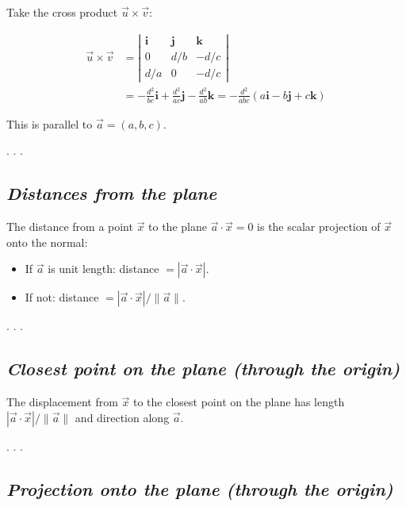 \documentclass[
  letterpaper,
  DIV=11,
  numbers=noendperiod]{scrartcl}
\providecommand{\tightlist}{%
  \setlength{\itemsep}{0pt}\setlength{\parskip}{0pt}}\usepackage{longtable,booktabs,array}
\begin{document}
Take the cross product \(\vec u \times \vec v\):

\[
\begin{aligned}
\vec u \times \vec v
&= \left|\begin{array}{ccc}
\mathbf{i} & \mathbf{j} & \mathbf{k} \\
0 & d/b & -d/c \\
d/a & 0 & -d/c
\end{array}\right| \\
&= -\frac{d^2}{bc} \mathbf{i} + \frac{d^2}{ac} \mathbf{j} - \frac{d^2}{ab} \mathbf{k}
= -\frac{d^2}{abc} \left( a \mathbf{i} - b \mathbf{j} + c \mathbf{k} \right)
\end{aligned}
\]

This is parallel to \(\vec{a} = (a, b, c)\).

. . .

\subsection{\texorpdfstring{\emph{Distances from the
plane}}{Distances from the plane}}\label{distances-from-the-plane}

The distance from a point \(\vec x\) to the plane
\(\vec a \cdot \vec x = 0\) is the scalar projection of \(\vec x\) onto
the normal:

\begin{itemize}
\tightlist
\item
  If \(\vec a\) is unit length: distance \(= |\vec a \cdot \vec x|\).
\item
  If not: distance \(= |\vec a \cdot \vec x| / \|\vec a\|\).
\end{itemize}

. . .

\subsection{\texorpdfstring{\emph{Closest point on the plane (through
the
origin)}}{Closest point on the plane (through the origin)}}\label{closest-point-on-the-plane-through-the-origin}

The displacement from \(\vec x\) to the closest point on the plane has
length \(|\vec a \cdot \vec x|/\|\vec a\|\) and direction along
\(\vec a\).

. . .

\subsection{\texorpdfstring{\emph{Projection onto the plane (through the
origin)}}{Projection onto the plane (through the origin)}}\label{projection-onto-the-plane-through-the-origin}
\end{document}
